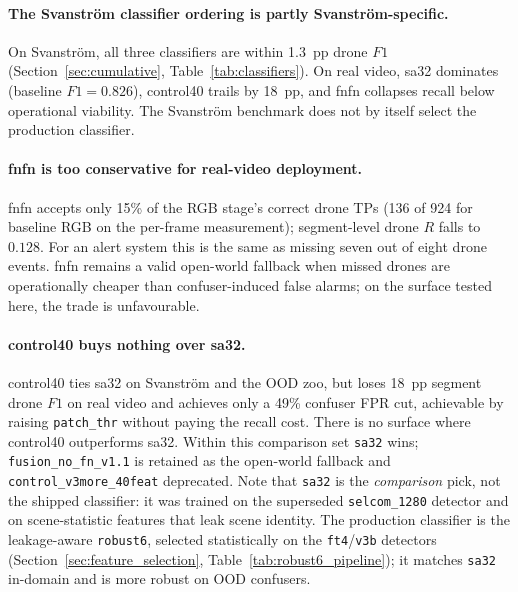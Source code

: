 \paragraph{The Svanstr\"om classifier ordering is partly Svanstr\"om-specific.}
On Svanstr\"om, all three classifiers are within 1.3~pp drone $F1$ (Section~\ref{sec:cumulative}, Table~\ref{tab:classifiers}). On real video, sa32 dominates (baseline $F1=0.826$), control40 trails by 18~pp, and fnfn collapses recall below operational viability. The Svanstr\"om benchmark does not by itself select the production classifier.

\paragraph{fnfn is too conservative for real-video deployment.}
fnfn accepts only 15\% of the RGB stage's correct drone TPs (136 of 924 for baseline RGB on the per-frame measurement); segment-level drone $R$ falls to $0.128$. For an alert system this is the same as missing seven out of eight drone events. fnfn remains a valid open-world fallback when missed drones are operationally cheaper than confuser-induced false alarms; on the surface tested here, the trade is unfavourable.

\paragraph{control40 buys nothing over sa32.}
control40 ties sa32 on Svanstr\"om and the OOD zoo, but loses 18~pp segment drone $F1$ on real video and achieves only a 49\% confuser FPR cut, achievable by raising \texttt{patch\_thr} without paying the recall cost. There is no surface where control40 outperforms sa32. Within this comparison set \texttt{sa32} wins; \texttt{fusion\_no\_fn\_v1.1} is retained as the open-world fallback and \texttt{control\_v3more\_40feat} deprecated. Note that \texttt{sa32} is the \emph{comparison} pick, not the shipped classifier: it was trained on the superseded \texttt{selcom\_1280} detector and on scene-statistic features that leak scene identity. The production classifier is the leakage-aware \texttt{robust6}, selected statistically on the \texttt{ft4}/\texttt{v3b} detectors (Section~\ref{sec:feature_selection}, Table~\ref{tab:robust6_pipeline}); it matches \texttt{sa32} in-domain and is more robust on OOD confusers.

